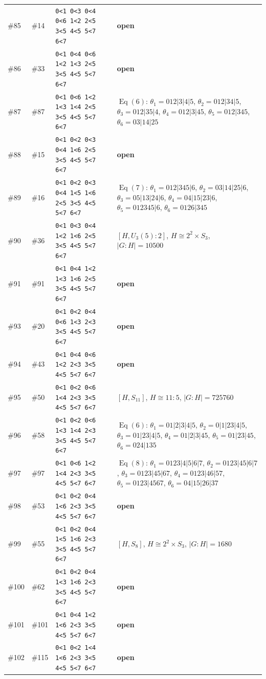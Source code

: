 \documentclass[11pt]{article}
\theoremstyle{remark}
\newcommand{\Eq}{\operatorname{Eq}}
\begin{document}
{\begin{longtable}{@{}l l p{4.9cm} p{7.4cm}@{}}
\#85 & \#14 & \texttt{0<1 0<3 0<4 0<6 1<2 2<5 3<5 4<5 5<7 6<7} & \textbf{open}\\
\#86 & \#33 & \texttt{0<1 0<4 0<6 1<2 1<3 2<5 3<5 4<5 5<7 6<7} & \textbf{open}\\
\#87 & \#87 & \texttt{0<1 0<6 1<2 1<3 1<4 2<5 3<5 4<5 5<7 6<7} & $\Eq(6)$: $\theta_1=012|3|4|5$, $\theta_2=012|34|5$, $\theta_3=012|35|4$, $\theta_4=012|3|45$, $\theta_5=012|345$, $\theta_6=03|14|25$\\
\#88 & \#15 & \texttt{0<1 0<2 0<3 0<4 1<6 2<5 3<5 4<5 5<7 6<7} & \textbf{open}\\
\#89 & \#16 & \texttt{0<1 0<2 0<3 0<4 1<5 1<6 2<5 3<5 4<5 5<7 6<7} & $\Eq(7)$: $\theta_1=012|345|6$, $\theta_2=03|14|25|6$, $\theta_3=05|13|24|6$, $\theta_4=04|15|23|6$, $\theta_5=012345|6$, $\theta_6=0126|345$\\
\#90 & \#36 & \texttt{0<1 0<3 0<4 1<2 1<6 2<5 3<5 4<5 5<7 6<7} & $[H,U_3(5){:}2]$, $H\cong 2^2\times S_{3}$, $|G:H|=10500$\\
\#91 & \#91 & \texttt{0<1 0<4 1<2 1<3 1<6 2<5 3<5 4<5 5<7 6<7} & \textbf{open}\\
\#93 & \#20 & \texttt{0<1 0<2 0<4 0<6 1<3 2<3 3<5 4<5 5<7 6<7} & \textbf{open}\\
\#94 & \#43 & \texttt{0<1 0<4 0<6 1<2 2<3 3<5 4<5 5<7 6<7} & \textbf{open}\\
\#95 & \#50 & \texttt{0<1 0<2 0<6 1<4 2<3 3<5 4<5 5<7 6<7} & $[H,S_{11}]$, $H\cong 11{:}5$, $|G:H|=725760$\\
\#96 & \#58 & \texttt{0<1 0<2 0<6 1<3 1<4 2<3 3<5 4<5 5<7 6<7} & $\Eq(6)$: $\theta_1=01|2|3|4|5$, $\theta_2=0|1|23|4|5$, $\theta_3=01|23|4|5$, $\theta_4=01|2|3|45$, $\theta_5=01|23|45$, $\theta_6=024|135$\\
\#97 & \#97 & \texttt{0<1 0<6 1<2 1<4 2<3 3<5 4<5 5<7 6<7} & $\Eq(8)$: $\theta_1=0123|4|5|6|7$, $\theta_2=0123|45|6|7$, $\theta_3=0123|45|67$, $\theta_4=0123|46|57$, $\theta_5=0123|4567$, $\theta_6=04|15|26|37$\\
\#98 & \#53 & \texttt{0<1 0<2 0<4 1<6 2<3 3<5 4<5 5<7 6<7} & \textbf{open}\\
\#99 & \#55 & \texttt{0<1 0<2 0<4 1<5 1<6 2<3 3<5 4<5 5<7 6<7} & $[H,S_8]$, $H\cong 2^2\times S_{3}$, $|G:H|=1680$\\
\#100 & \#62 & \texttt{0<1 0<2 0<4 1<3 1<6 2<3 3<5 4<5 5<7 6<7} & \textbf{open}\\
\#101 & \#101 & \texttt{0<1 0<4 1<2 1<6 2<3 3<5 4<5 5<7 6<7} & \textbf{open}\\
\#102 & \#115 & \texttt{0<1 0<2 1<4 1<6 2<3 3<5 4<5 5<7 6<7} & \textbf{open}\\

\end{longtable}}
\end{document}
